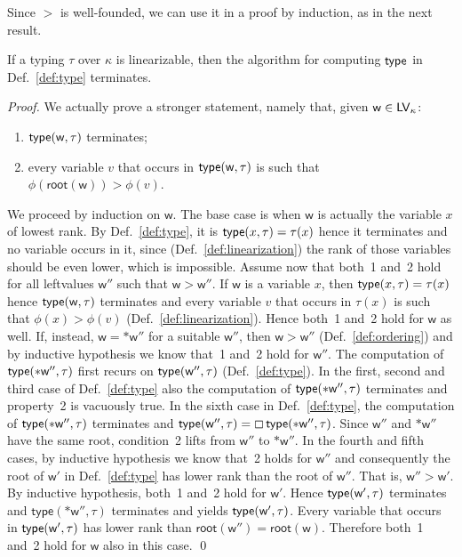 Since $>$ is well-founded, we can use it in a proof by induction, as in the next result.

\begin{proposition}\label{prop:termination}
  If a typing $\tau$ over $\kappa$ is linearizable, then the algorithm for computing $\mathsf{type}$ in
  Def.~\ref{def:type} terminates.
\end{proposition}
\begin{proof}
  We actually prove a stronger statement, namely that, given $\mathsf{w}\in\mathsf{LV}_\kappa$:
  \begin{enumerate}
  \item $\mathsf{type}(\mathsf{w},\tau)$ terminates;
  \item every variable $v$ that occurs in $\mathsf{type}(\mathsf{w},\tau)$
    is such that $\phi(\mathsf{root}(\mathsf{w}))>\phi(v)$.
  \end{enumerate}
  We proceed by induction on $\mathsf{w}$. The base case is when $\mathsf{w}$ is actually the variable $x$
  of lowest rank. By Def.~\ref{def:type}, it is $\mathsf{type}(x,\tau)=\tau(x)$ hence it terminates and
  no variable occurs in it, since (Def.~\ref{def:linearization})
  the rank of those variables should be even lower, which is impossible.
  Assume now that both~1 and~2 hold for all leftvalues
  $\mathsf{w}''$ such that $\mathsf{w}>\mathsf{w}''$.
  If $\mathsf{w}$ is a variable $x$, then $\mathsf{type}(x,\tau)=\tau(x)$ hence
  $\mathsf{type}(\mathsf{w},\tau)$ terminates and every variable $v$ that occurs in $\tau(x)$ is such that
  $\phi(x)>\phi(v)$ (Def.~\ref{def:linearization}). Hence both~1 and~2 hold for $\mathsf{w}$ as well.
  If, instead, $\mathsf{w}=\mathtt{*}\mathsf{w}''$ for a suitable $\mathsf{w}''$,
  then $\mathsf{w}>\mathsf{w}''$ (Def.~\ref{def:ordering}) and by inductive hypothesis we know that~1
  and~2 hold for $\mathsf{w}''$. The computation of $\mathsf{type}(\mathtt{*}\mathsf{w}'',\tau)$
  first recurs on $\mathsf{type}(\mathsf{w}'',\tau)$ (Def.~\ref{def:type}).
  In the first, second and third case of Def.~\ref{def:type} also the
  computation of $\mathsf{type}(\mathtt{*}\mathsf{w}'',\tau)$ terminates and property~2 is vacuously true.
  In the sixth case in Def.~\ref{def:type}, the computation of
  $\mathsf{type}(\mathtt{*}\mathsf{w}'',\tau)$ terminates and
  $\mathsf{type}(\mathsf{w}'',\tau)=\boxempty\,{\mathsf{type}(\mathtt{*}\mathsf{w}'',\tau)}$.
  Since $\mathsf{w}''$ and $\mathtt{*}\mathsf{w}''$ have the same root, condition~2
  lifts from $\mathsf{w}''$ to $\mathtt{*}\mathsf{w}''$.
  In the fourth and fifth cases, by inductive hypothesis we know that~2 holds
  for $\mathsf{w}''$ and consequently the root of $\mathsf{w}'$ in Def.~\ref{def:type}
  has lower rank than the root of $\mathsf{w}''$. That is, $\mathsf{w}''>\mathsf{w}'$.
  By inductive hypothesis, both~1 and~2 hold for $\mathsf{w}'$. Hence
  $\mathsf{type}(\mathsf{w}',\tau)$ terminates and
  $\mathsf{type}(\mathtt{*}\mathsf{w}'',\tau)$ terminates and yields
  $\mathsf{type}(\mathsf{w}',\tau)$.
  Every variable that occurs in
  $\mathsf{type}(\mathsf{w}',\tau)$ has lower rank than
  $\mathsf{root}(\mathsf{w}'')=\mathsf{root}(\mathsf{w})$. Therefore
  both~1 and~2 hold for $\mathsf{w}$ also in this case.
  \qed
\end{proof}
